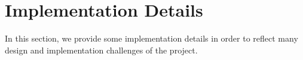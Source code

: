 \section{Implementation Details}

In this section, we provide some implementation details in order to reflect many design and implementation challenges of the project.




